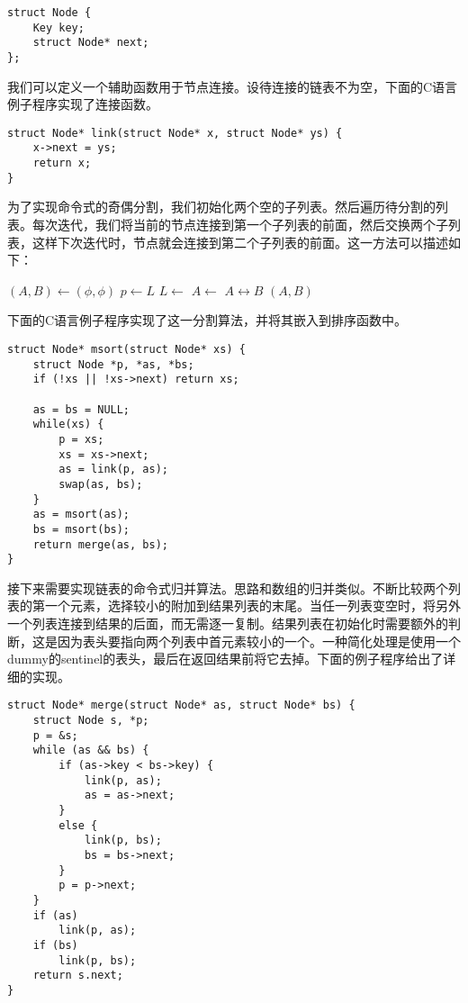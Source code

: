 \documentclass{ctexart}
\begin{document}
\lstset{language=C}
\begin{lstlisting}
struct Node {
    Key key;
    struct Node* next;
};
\end{lstlisting}

我们可以定义一个辅助函数用于节点连接。设待连接的链表不为空，下面的C语言例子程序实现了连接函数。

\lstset{language=C}
\begin{lstlisting}
struct Node* link(struct Node* x, struct Node* ys) {
    x->next = ys;
    return x;
}
\end{lstlisting}

为了实现命令式的奇偶分割，我们初始化两个空的子列表。然后遍历待分割的列表。每次迭代，我们将当前的节点连接到第一个子列表的前面，然后交换两个子列表，这样下次迭代时，节点就会连接到第二个子列表的前面。这一方法可以描述如下：

\begin{algorithmic}[1]
  \State $(A, B) \gets (\phi, \phi)$
    \State $p \gets L$
    \State $L \gets $ 
    \State $A \gets $ 
    \State {} $A \leftrightarrow B$
  \EndWhile
  \State \Return $(A, B)$
\EndFunction
\end{algorithmic}

下面的C语言例子程序实现了这一分割算法，并将其嵌入到排序函数中。

\lstset{language=C}
\begin{lstlisting}
struct Node* msort(struct Node* xs) {
    struct Node *p, *as, *bs;
    if (!xs || !xs->next) return xs;

    as = bs = NULL;
    while(xs) {
        p = xs;
        xs = xs->next;
        as = link(p, as);
        swap(as, bs);
    }
    as = msort(as);
    bs = msort(bs);
    return merge(as, bs);
}
\end{lstlisting}

接下来需要实现链表的命令式归并算法。思路和数组的归并类似。不断比较两个列表的第一个元素，选择较小的附加到结果列表的末尾。当任一列表变空时，将另外一个列表连接到结果的后面，而无需逐一复制。结果列表在初始化时需要额外的判断，这是因为表头要指向两个列表中首元素较小的一个。一种简化处理是使用一个dummy的sentinel的表头，最后在返回结果前将它去掉。下面的例子程序给出了详细的实现。

\lstset{language=C}
\begin{lstlisting}
struct Node* merge(struct Node* as, struct Node* bs) {
    struct Node s, *p;
    p = &s;
    while (as && bs) {
        if (as->key < bs->key) {
            link(p, as);
            as = as->next;
        }
        else {
            link(p, bs);
            bs = bs->next;
        }
        p = p->next;
    }
    if (as)
        link(p, as);
    if (bs)
        link(p, bs);
    return s.next;
}
\end{lstlisting}
\end{document}
